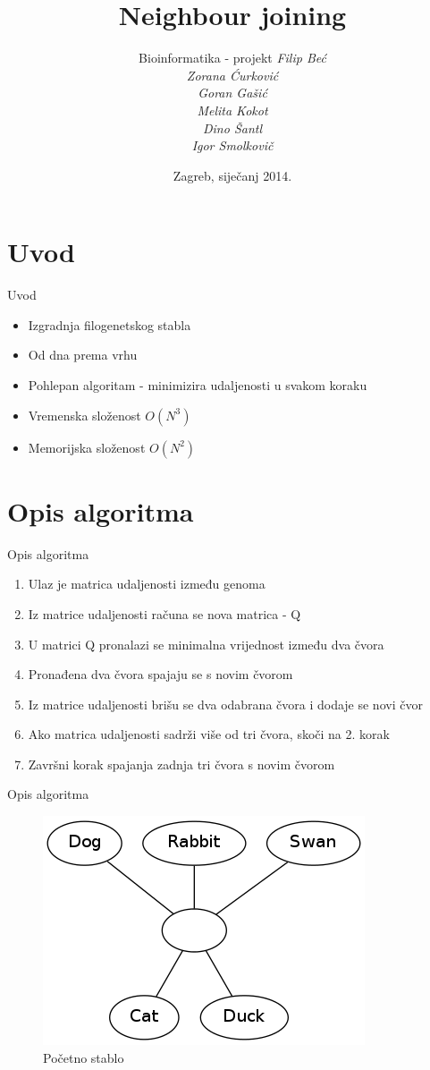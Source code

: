 \documentclass[utf8]{beamer}
\title[Neighbour joining]{Neighbour joining}
\author[Dino Šantl]{Bioinformatika - projekt \newline\newline 
				 \itshape		{Filip Beć}\\
				 \itshape{Zorana Ćurković}\\
				 \itshape{Goran Gašić}\\
				 \itshape{Melita Kokot}\\
				 \itshape{Dino Šantl}\\
				 \itshape{Igor Smolkovič}
}
\institute{Fakultet elektrotehnike i računarstva}
\date{Zagreb, siječanj 2014.}
\begin{document}
\begin{frame}
\titlepage
\end{frame}

\section{Uvod}
\begin{frame}{Uvod}
\begin{itemize}
	\item Izgradnja filogenetskog stabla
	\item Od dna prema vrhu
	\item Pohlepan algoritam - minimizira udaljenosti u svakom koraku
	\item Vremenska složenost $O(N^3)$
	\item Memorijska složenost $O(N^2)$
\end{itemize}
\end{frame}

\section{Opis algoritma}
\begin{frame}{Opis algoritma}
\begin{enumerate}
	\item Ulaz je matrica udaljenosti između genoma 
	\pause
	\item Iz matrice udaljenosti računa se nova matrica - Q
	\pause
	\item U matrici Q pronalazi se minimalna vrijednost između dva čvora
	\pause
	\item Pronađena dva čvora spajaju se s novim čvorom
	\pause
	\item Iz matrice udaljenosti brišu se dva odabrana čvora i dodaje se
novi čvor
	\pause
	\item Ako matrica udaljenosti sadrži više od tri čvora, skoči na 2. korak
	\pause
	\item Završni korak spajanja zadnja tri čvora s novim čvorom
\end{enumerate}
\end{frame}

\begin{frame}{Opis algoritma}
\begin{figure}[htb]
\centering
\includegraphics[scale=0.5]{../Dokumentacija/img/pocetni.png}
\caption{Početno stablo}
\end{figure}
\end{frame}
\end{document}
